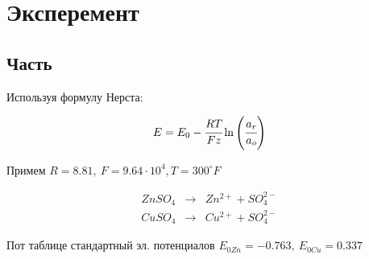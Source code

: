 \section{Эксперемент}

\subsection{Часть}

Используя формулу Нерста: 

\begin{equation}
  E = E_0 - \cfrac{RT}{Fz}\ln\left( \cfrac{a_{r}}{a_o} \right)  
\end{equation}

Примем $R = 8.81, \ F = 9.64\cdot10^4, T = 300^{\circ}F$

\begin{eqnarray}
  ZnSO_4 &\to& Zn^{2+} + SO_4^{2-} \\
  CuSO_4 &\to& Cu^{2+} + SO_4^{2-}
\end{eqnarray}

Пот таблице стандартный эл. потенциалов
 $E_{0Zn} = -0.763, \ E_{0Cu} = 0.337 $










